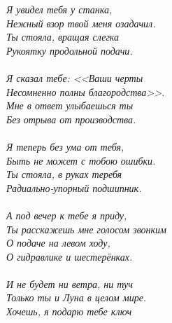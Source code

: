 \vspace{0.3cm}
\noindent\textit{%
\hspace*{2.7cm}Я увидел тебя у станка,\\
\hspace*{2.7cm}Нежный взор твой меня озадачил.\\
\hspace*{2.7cm}Ты стояла, вращая слегка\\
\hspace*{2.7cm}Рукоятку продольной подачи.\\
\\
\hspace*{2.7cm}Я сказал тебе: <<Ваши черты\\
\hspace*{2.7cm}Несомненно полны благородства>>.\\
\hspace*{2.7cm}Мне в ответ улыбаешься ты\\
\hspace*{2.7cm}Без отрыва от производства.\\
\\
\hspace*{2.7cm}Я теперь без ума от тебя,\\
\hspace*{2.7cm}Быть не может с тобою ошибки.\\
\hspace*{2.7cm}Ты стояла, в руках теребя\\
\hspace*{2.7cm}Радиально-упорный подшипник.\\
\\
\hspace*{2.7cm}А под вечер к тебе я приду,\\
\hspace*{2.7cm}Ты расскажешь мне голосом звонким\\
\hspace*{2.7cm}О подаче на левом ходу,\\
\hspace*{2.7cm}О гидравлике и шестерёнках.\\
\\
\hspace*{2.7cm}И не будет ни ветра, ни туч\mdash\\
\hspace*{2.7cm}Только ты и Луна в целом мире.\\
\hspace*{2.7cm}Хочешь, я подарю тебе ключ\\
}
